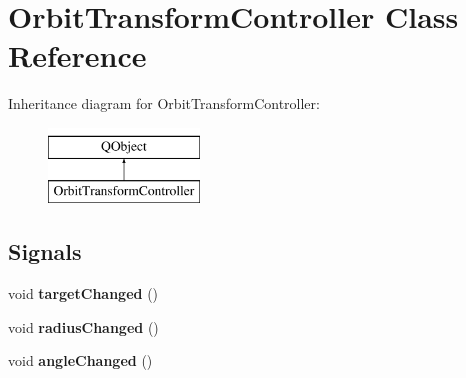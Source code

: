 \hypertarget{class_orbit_transform_controller}{}\section{Orbit\+Transform\+Controller Class Reference}
\label{class_orbit_transform_controller}
Inheritance diagram for Orbit\+Transform\+Controller\+:\begin{figure}[H]
\begin{center}
\leavevmode
\includegraphics[height=2.000000cm]{class_orbit_transform_controller}
\end{center}
\end{figure}
\subsection*{Signals}
\begin{DoxyCompactItemize}
\item 
void {\bfseries target\+Changed} ()\hypertarget{class_orbit_transform_controller_af86371555346d6c85d0fada3f262a0cd}{}\label{class_orbit_transform_controller_af86371555346d6c85d0fada3f262a0cd}

\item 
void {\bfseries radius\+Changed} ()\hypertarget{class_orbit_transform_controller_a39ac6a5e8a31bb2ef1d4444baa95743e}{}\label{class_orbit_transform_controller_a39ac6a5e8a31bb2ef1d4444baa95743e}

\item 
void {\bfseries angle\+Changed} ()\hypertarget{class_orbit_transform_controller_acc3b82da234df20646e01721069c455e}{}\label{class_orbit_transform_controller_acc3b82da234df20646e01721069c455e}

\end{DoxyCompactItemize}
